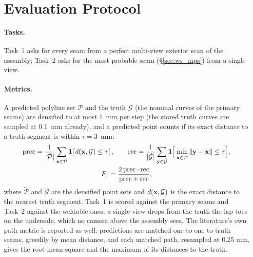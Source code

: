 \section{Evaluation Protocol}
\label{sec:ws_protocol}

\paragraph{Tasks.} Task~1 asks for every seam from a perfect multi-view exterior scan of the
assembly; Task~2 asks for the most probable seam (\S\ref{sec:ws_mps}) from a single view.

\paragraph{Metrics.} A predicted polyline set $\mathcal{P}$ and the truth $\mathcal{G}$ (the
nominal curves of the primary seams) are densified to at most 1~mm per step (the stored truth
curves are sampled at 0.1~mm already), and a predicted point counts if its exact distance to a truth
segment is within $\tau=3$~mm:
\begin{equation}
\begin{gathered}
\mathrm{prec}=\frac{1}{|\tilde{\mathcal{P}}|}\sum_{\mathbf{x}\in\tilde{\mathcal{P}}}\mathbf{1}\big[d(\mathbf{x},\mathcal{G})\le\tau\big],\qquad
\mathrm{rec}=\frac{1}{|\tilde{\mathcal{G}}|}\sum_{\mathbf{y}\in\tilde{\mathcal{G}}}\mathbf{1}\Big[\min_{\mathbf{x}\in\tilde{\mathcal{P}}}\left\lVert\mathbf{y}-\mathbf{x}\right\rVert\le\tau\Big],\\
F_1=\frac{2\,\mathrm{prec}\cdot\mathrm{rec}}{\mathrm{prec}+\mathrm{rec}},
\end{gathered}
\label{eq:ws_f1}
\end{equation}
where $\tilde{\mathcal{P}}$ and $\tilde{\mathcal{G}}$ are the densified point sets and
$d(\mathbf{x},\mathcal{G})$ is the exact distance to the nearest truth segment. Task~1 is scored
against the primary seams and Task~2 against the weldable ones; a single view drops from the truth
the lap toes on the underside, which no camera above the assembly sees.
The literature's own path metric is reported as well: predictions are matched one-to-one to
truth seams, greedily by mean distance, and each matched path, resampled at 0.25 mm, gives
the root-mean-square and the maximum of its distances to the truth.

